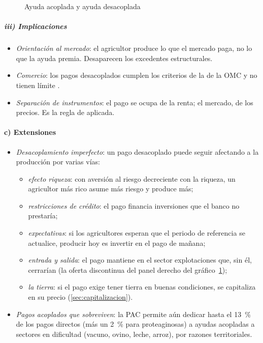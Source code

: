\documentclass[11pt]{article}
\begin{document}
\begin{figure}[H]
\centering
\caption{Ayuda acoplada y ayuda desacoplada}\label{fig:desacoplamiento}
\end{figure}

\subparagraph{iii) Implicaciones}

\begin{itemize}
\item \emph{Orientación al mercado}: el agricultor produce lo que el mercado paga, no lo que la ayuda premia. Desaparecen los excedentes estructurales.
\item \emph{Comercio}: los pagos desacoplados cumplen los criterios de la  de la OMC y no tienen límite .
\item \emph{Separación de instrumentos}: el pago se ocupa de la renta; el mercado, de los precios. Es la regla de  aplicada.
\end{itemize}

\paragraph{c) Extensiones}

\begin{itemize}
\item \emph{Desacoplamiento imperfecto}: un pago desacoplado puede seguir afectando a la producción por varias vías:
  \begin{itemize}
  \item \emph{efecto riqueza}: con aversión al riesgo decreciente con la riqueza, un agricultor más rico asume más riesgo y produce más\nocite{Hennessy1998Production};
  \item \emph{restricciones de crédito}: el pago financia inversiones que el banco no prestaría;
  \item \emph{expectativas}: si los agricultores esperan que el periodo de referencia se actualice, producir hoy es invertir en el pago de mañana;
  \item \emph{entrada y salida}: el pago mantiene en el sector explotaciones que, sin él, cerrarían (la oferta discontinua del panel derecho del gráfico~\ref{fig:desacoplamiento});
  \item \emph{la tierra}: si el pago exige tener tierra en buenas condiciones, se capitaliza en su precio (\ref{sec:capitalizacion}).
  \end{itemize}
\item \emph{Pagos acoplados que sobreviven}: la PAC permite aún dedicar hasta el 13~\% de los pagos directos (más un 2~\% para proteaginosas) a ayudas acopladas a sectores en dificultad (vacuno, ovino, leche, arroz), por razones territoriales.
\end{itemize}
\end{document}
